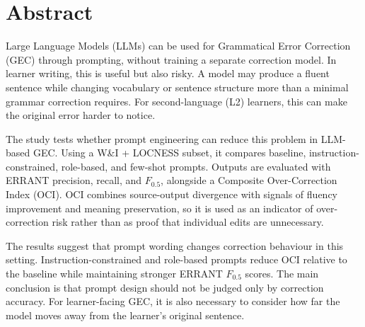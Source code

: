 \chapter*{\Large \center Abstract}

Large Language Models (LLMs) can be used for Grammatical Error Correction (GEC) through prompting, without training a separate correction model. In learner writing, this is useful but also risky. A model may produce a fluent sentence while changing vocabulary or sentence structure more than a minimal grammar correction requires. For second-language (L2) learners, this can make the original error harder to notice.

The study tests whether prompt engineering can reduce this problem in LLM-based GEC. Using a W\&I + LOCNESS subset, it compares baseline, instruction-constrained, role-based, and few-shot prompts. Outputs are evaluated with ERRANT precision, recall, and $F_{0.5}$, alongside a Composite Over-Correction Index (OCI). OCI combines source-output divergence with signals of fluency improvement and meaning preservation, so it is used as an indicator of over-correction risk rather than as proof that individual edits are unnecessary.

The results suggest that prompt wording changes correction behaviour in this setting. Instruction-constrained and role-based prompts reduce OCI relative to the baseline while maintaining stronger ERRANT $F_{0.5}$ scores. The main conclusion is that prompt design should not be judged only by correction accuracy. For learner-facing GEC, it is also necessary to consider how far the model moves away from the learner's original sentence.
